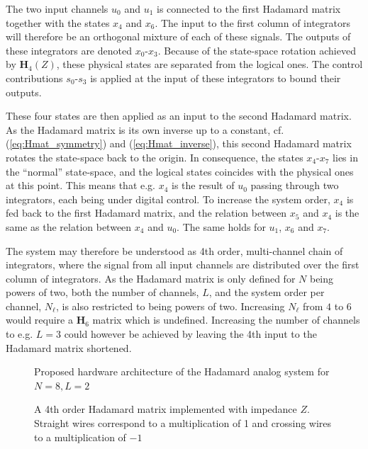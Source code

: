 The two input channels $u_0$ and $u_1$ is connected to the first Hadamard matrix together with the states $x_4$ and $x_6$. The input to the first column of integrators will therefore be an orthogonal mixture of each of these signals. The outputs of these integrators are denoted $x_0$-$x_3$. Because of the state-space rotation achieved by $\bm{H}_4(Z)$, these physical states are separated from the logical ones. The control contributions $s_0$-$s_3$ is applied at the input of these integrators to bound their outputs.

These four states are then applied as an input to the second Hadamard matrix. As the Hadamard matrix is its own inverse up to a constant, cf. (\ref{eq:Hmat_symmetry}) and (\ref{eq:Hmat_inverse}), this second Hadamard matrix rotates the state-space back to the origin. In consequence, the states $x_4$-$x_7$ lies in the \enquote{normal} state-space, and the logical states coincides with the physical ones at this point. This means that e.g. $x_4$ is the result of $u_0$ passing through two integrators, each being under digital control. To increase the system order, $x_4$ is fed back to the first Hadamard matrix, and the relation between $x_5$ and $x_4$ is the same as the relation between $x_4$ and $u_0$. The same holds for $u_1$, $x_6$ and $x_7$.

The system may therefore be understood as 4th order, multi-channel chain of integrators, where the signal from all input channels are distributed over the first column of integrators. As the Hadamard matrix is only defined for $N$ being powers of two, both the number of channels, $L$, and the system order per channel, $N_{\ell}$, is also restricted to being powers of two. Increasing $N_\ell$ from $4$ to $6$ would require a $\bm{H}_6$ matrix which is undefined. Increasing the number of channels to e.g. $L=3$ could however be achieved by leaving the 4th input to the Hadamard matrix shortened.

\begin{figure}
    \centering
    
    \caption{Proposed hardware architecture of the Hadamard analog system for $N=8, L=2$}
    \label{fig:HCI_AS_01}
\end{figure}

\begin{figure}[htbp]
    \centering
    
    \caption{A 4th order Hadamard matrix implemented with impedance $Z$. Straight wires correspond to a multiplication of 1 and crossing wires to a multiplication of $-1$}
    \label{fig:H4Z}
\end{figure}








